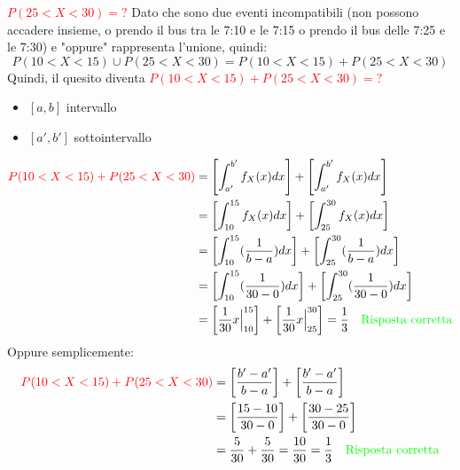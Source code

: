 \documentclass{article}  %
\theoremstyle{definition}
\begin{document}
\begin{esercizio}[Esercizio]
{	} \textcolor{red}{$P(25<X<30)=?$} Dato che sono due eventi incompatibili (non possono accadere insieme, o prendo il bus
	tra le 7:10 e le 7:15 o prendo il bus delle 7:25 e le 7:30) e "oppure" rappresenta l'unione, quindi:
	\[
		P(10<X<15) \cup P(25<X<30)=P(10<X<15)+P(25<X<30)
	\]
	Quindi, il quesito diventa \textcolor{red}{$P(10<X<15)+P(25<X<30)=?$}
	\begin{itemize}
		\item $[a,b]$ intervallo
		\item $[a',b']$ sottointervallo
	\end{itemize}
	\begin{align*}
		\textcolor{red}{P(10<X<15)+P(25<X<30)}
		 & = \left[\int_{a'}^{b'}f_X(x)dx\right]+\left[\int_{a'}^{b'}f_X(x)dx\right]                                                                               \\
		 & = \left[\int_{10}^{15}f_X(x)dx\right]+\left[\int_{25}^{30}f_X(x)dx\right]                                                                               \\
		 & = \left[\int_{10}^{15}(\frac{1}{b-a})dx\right]+\left[\int_{25}^{30}(\frac{1}{b-a})dx\right]                                                             \\
		 & = \left[\int_{10}^{15}(\frac{1}{30-0})dx\right]+\left[\int_{25}^{30}(\frac{1}{30-0})dx\right]                                                           \\
		 & = \left[\frac{1}{30}x \Big|_{10}^{15}\right]+\left[\frac{1}{30}x \Big|_{25}^{30}\right] = \frac{1}{3} \quad \textcolor{green}{\text{Risposta corretta}}
	\end{align*}
	Oppure semplicemente:
	\begin{align*}
		\textcolor{red}{P(10<X<15)+P(25<X<30)}
		 & = \left[\frac{b'-a'}{b-a}\right]+\left[\frac{b'-a'}{b-a}\right]                                         \\
		 & = \left[\frac{15-10}{30-0}\right]+\left[\frac{30-25}{30-0}\right]                                       \\
		 & = \frac{5}{30}+\frac{5}{30}=\frac{10}{30}=\frac{1}{3} \quad \textcolor{green}{\text{Risposta corretta}}
	\end{align*}
\end{esercizio}
\end{document}
